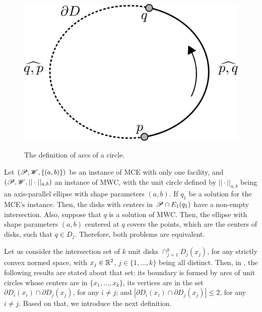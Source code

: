 \begin{figure}[!htb]
	\centering
	
	\caption{The definition of arcs of a circle.}
	\includegraphics[scale=.3]{tex/figures/disk_arc.pdf}
	\fautor
	\label{fig:disk_arc}
\end{figure}

Let $(\mathscr{P}, \mathscr{W}, \{(a, b)\})$ be an instance of MCE with only one facility, and $(\mathscr{P}, \mathscr{W}, ||\cdot||_{a,b})$ an instance of MWC, with the unit circle defined by $||\cdot||_{a,b}$ being an axis-parallel ellipse with shape parameters $(a,b)$.
If $q_1$ be a solution for the MCE's instance. Then, the disks with centers in $\mathscr{P} \cap E_1(q_1)$ have a non-empty intersection.
Also, suppose that $q$ is a solution of MWC. Then, the ellipse with shape parameters $(a, b)$ centered at $q$ covers the points, which are the centers of disks, such that $q \in D_j$.
Therefore, both problems are equivalent.

Let us consider the intersection set of $k$ unit disks $\cap_{j=1}^k D_j(x_j)$, for any strictly convex normed space, with $x_j \in \mathbb{R}^2$, $j\in \{1, \dots, k\}$ being all distinct.
Then, in , the following results are stated about that set: its boundary is formed by arcs of unit circles whose centers are in $\{x_1, \dots, x_k\}$, its vertices are in the set $\partial D_i(x_i) \cap \partial D_j(x_j)$, for any $i \neq j$; and $|\partial D_i(x_i) \cap \partial D_j(x_j)| \le 2$, for any $i\neq j$. 
Based on that, we introduce the next definition.

